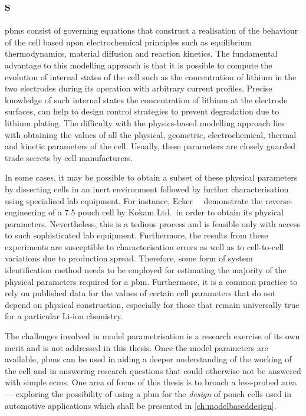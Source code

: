 \subsection{s}\label{subsec:pbms}


\glspl{pbm} consist of  governing equations that construct a  realisation of the
behaviour of the cell based  upon electrochemical principles such as equilibrium
thermodynamics,  material  diffusion  and  reaction  kinetics.  The  fundamental
advantage  to this  modelling approach  is that  it is  possible to  compute the
evolution of  internal states of  the cell  such as the concentration of lithium
in the two electrodes during its operation with arbitrary current  profiles.
Precise knowledge of such internal states \eg{} the concentration of lithium at
the electrode surfaces, can help to design control strategies to prevent
degradation due to lithium plating.  The difficulty with  the physics-based
modelling approach  lies with  obtaining the values  of all  the physical,
geometric, electrochemical,  thermal and  kinetic parameters  of the  cell.
Usually,  these parameters  are closely  guarded trade secrets by cell
manufacturers.

In  some  cases, it  may  be  possible to  obtain  a  subset of  these  physical
parameters   by  dissecting   cells  in   an  inert   environment  followed   by
further  characterisation   using  specialised  lab  equipment.   For  instance,
Ecker~\etal~\cite{Ecker2015}   demonstrate   the    reverse-engineering   of   a
\SI{7.5}{\amphour} pouch  cell by Kokam  Ltd.\ in  order to obtain  its physical
parameters. Nevertheless,  this is a tedious  process and is feasible  only with
access  to  such sophisticated  lab  equipment.  Furthermore, the  results  from
these  experiments are  susceptible to  characterisation  errors as  well as  to
cell-to-cell variations due to production spread. Therefore, some form of system
identification method  needs to be employed  for estimating the majority  of the
physical  parameters required  for  a  \gls{pbm}. Furthermore,  it  is a  common
practice to  rely on published  data for the  values of certain  cell parameters
that do  not depend on physical  construction, especially for those  that remain
universally true for a particular Li-ion chemistry.

The challenges involved  in model parametrisation is a research  exercise of its
own merit and  is not addressed in  this thesis.  Once  the model parameters are
available, \glspl{pbm} can be used in  aiding a deeper understanding of the
working of  the cell and in answering research  questions that could  otherwise
not be answered  with simple \glspl{ecm}. One area  of focus of this  thesis is
to broach  a less-probed area --- exploring  the possibility  of using  a
\gls{pbm}  for the  \emph{design} of pouch  cells  used  in  automotive
applications which  shall  be  presented  in \cref{ch:modelbaseddesign}.

